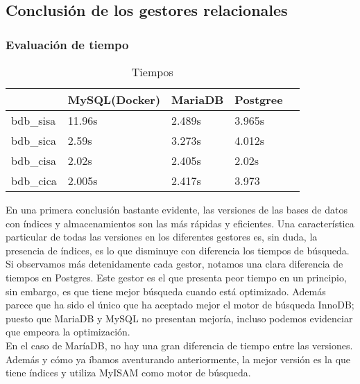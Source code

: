 \documentclass[12pt,a4paper]{article}
\begin{document}

\newpage
\subsection {Conclusión de los gestores relacionales} \label{pto33}
\subsubsection{Evaluación de tiempo} \label{pto331}

\begin{table}[!h]
\centering
\caption{Tiempos}
\label{tiempos}
\begin{tabular}{|l|l|l|l|l}
\hline
 & MySQL(Docker) & MariaDB  & Postgree   \\ \hline
 bdb\_sisa & 11.96s & 2.489s  &  3.965s   \\ 
 bdb\_sica & 2.59s &  3.273s &  4.012s   \\ 
 bdb\_cisa & 2.02s  & 2.405s   & 2.02s   \\ 
 bdb\_cica & 2.005s & 2.417s &  3.973   
\end{tabular}
\end{table}

\vspace{5em}

En una primera conclusión bastante evidente, las versiones de las bases de datos con índices y almacenamientos son las más rápidas y eficientes. Una característica particular de todas las versiones en los diferentes gestores es, sin duda, la presencia de índices, es lo que disminuye con diferencia los tiempos de búsqueda.\\


Si observamos más detenidamente cada gestor, notamos una clara diferencia de tiempos en Postgres. Este gestor es el que presenta peor tiempo en un principio, sin embargo, es que tiene mejor búsqueda cuando está optimizado. Además parece que ha sido el único que ha aceptado mejor el motor de búsqueda InnoDB; puesto que MariaDB y MySQL no presentan mejoría, incluso podemos evidenciar que empeora la optimización.\\


En el caso de MaríaDB, no hay una gran diferencia de tiempo entre las versiones. Además y cómo ya íbamos aventurando anteriormente, la mejor versión es la que tiene índices y utiliza MyISAM como motor de búsqueda.\\
\end{document}
